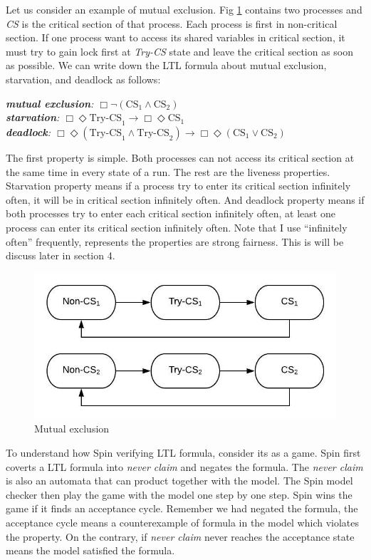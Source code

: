 Let us consider an example of mutual exclusion. Fig \ref{fig:mutex} contains two processes and \textit{CS} is the critical section of that process. Each process is first in non-critical section. If one process want to access its shared variables in critical section, it must try to gain lock first at \textit{Try-CS} state and leave the critical section as soon as possible. We can write down the LTL formula about mutual exclusion, starvation, and deadlock as follows:

{\medbreak\indent\textit{\textbf{mutual exclusion}: $\Box\neg(\text{CS}_1\wedge\text{CS}_2)$}}
{\\\indent\textit{\textbf{starvation}: $\Box\Diamond \text{Try-CS}_1\rightarrow\Box\Diamond\text{CS}_1$}}
{\\\indent\textit{\textbf{deadlock}: $\Box\Diamond(\text{Try-CS}_1\wedge\text{Try-CS}_2)\rightarrow\Box\Diamond(\text{CS}_1\vee\text{CS}_2)$}}
\medbreak

The first property is simple. Both processes can not access its critical section at the same time in every state of a run. The rest are the liveness properties. Starvation property means if a process try to enter its critical section infinitely often, it will be in critical section infinitely often. And deadlock property means if both processes try to enter each critical section infinitely often, at least one process can enter its critical section infinitely often. Note that I use ``infinitely often'' frequently, represents the properties are strong fairness. This is will be discuss later in section 4.

\begin{figure}
\includegraphics[width=0.7\linewidth]{mutex}
\caption{Mutual exclusion}
\label{fig:mutex}
\end{figure}

To understand how Spin verifying LTL formula, consider its as a game. Spin first coverts a LTL formula into \textit{never claim} and negates the formula. The \textit{never claim} is also an automata that can product together with the model. The Spin model checker then play the game with the model one step by one step. Spin wins the game if it finds an acceptance cycle. Remember we had negated the formula, the acceptance cycle means a counterexample of formula in the model which violates the property. On the contrary, if \textit{never claim} never reaches the acceptance state means the model satisfied the formula.

